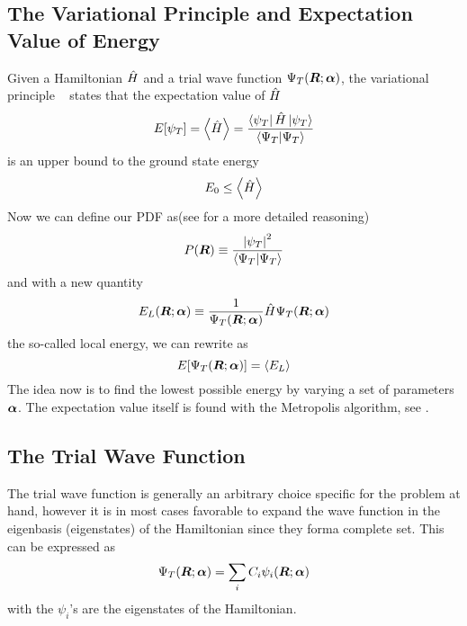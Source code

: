     \subsection{The Variational Principle and Expectation Value of Energy}
        Given a Hamiltonian $\hat{H}$ and a trial wave function ${\Psi}_T(\boldsymbol{{R}};\boldsymbol{{\alpha}})$, the
        variational principle ~\cite{GriffQuan, NeOr} states that the
        expectation value of $\hat{H}$
            \begin{equation}
                E[\psi_T] = \left< {\hat{H}} \right> =
                \frac{\bra{\psi_T}\hat{H}\ket{\psi_T}}{\bra{\Psi_T}\ket{\Psi_T}}
                \label{eq:ecpE}
            \end{equation}
        is an upper bound to the ground state energy
            \begin{equation}
                E_0 \leq \left< {\hat{H}} \right>
                \label{eq:ecpEBound}
            \end{equation}
        Now we can define our PDF as(see  for a more
        detailed reasoning)
            \begin{equation}
                P(\boldsymbol{{R}}) \equiv \frac{\abs{\psi_T}^2}{\bra{\Psi_T}\ket{\Psi_T}}
                \label{eq:PDFdef}
            \end{equation}
        and with a new quantity
            \begin{equation}
                E_L(\boldsymbol{{R}};\boldsymbol{{\alpha}}) \equiv \frac{1}{{\Psi}_T(\boldsymbol{{R}};\boldsymbol{{\alpha}})}\hat{H}{\Psi}_T(\boldsymbol{{R}};\boldsymbol{{\alpha}})
                \label{eq:ELdef}
            \end{equation}
        the so-called local energy, we can rewrite  as
            \begin{equation}
                E[{\Psi}_T(\boldsymbol{{R}};\boldsymbol{{\alpha}})] = \left< {E_L} \right>
            \end{equation}
        The idea now is to find the lowest possible energy by varying a set of
        parameters $\boldsymbol{{\alpha}}$. The expectation value itself is found with
        the Metropolis algorithm, see .

    \subsection{The Trial Wave Function}
        The trial wave function is generally an arbitrary choice specific for
        the problem at hand, however it is in most cases favorable to expand
        the wave function in the eigenbasis (eigenstates) of the Hamiltonian
        since they forma complete set. This can be expressed as
            \begin{equation}
                {\Psi}_T(\boldsymbol{{R}};\boldsymbol{{\alpha}}) = \sum_i C_i\psi_i(\boldsymbol{{R}};\boldsymbol{{\alpha}})
            \end{equation}
        with the $\psi_i$'s are the eigenstates of the Hamiltonian.

